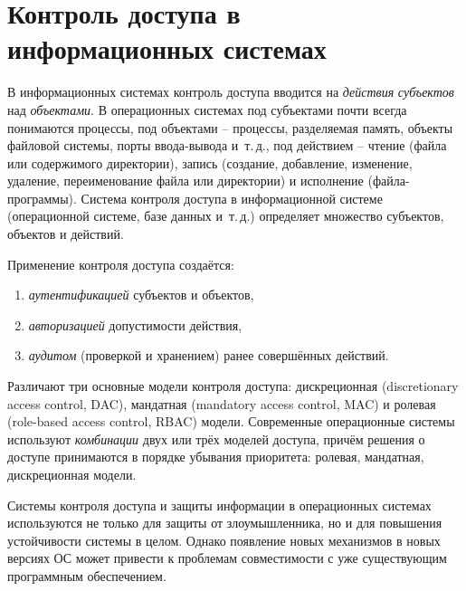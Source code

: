 \section[Контроль доступа в информационных системах]{Контроль доступа в \protect\\ информационных системах}


В информационных системах контроль доступа вводится на \emph{действия} \emph{субъектов} над \emph{объектами}. В операционных системах под субъектами почти всегда понимаются процессы, под объектами -- процессы, разделяемая память, объекты файловой системы, порты ввода-вывода и~т.\,д., под действием -- чтение (файла или содержимого директории), запись (создание, добавление, изменение, удаление, переименование файла или директории) и исполнение (файла-программы). Система контроля доступа в информационной системе (операционной системе, базе данных и~т.\,д.) определяет множество субъектов, объектов и действий.

Применение контроля доступа создаётся:

\begin{enumerate}
	\item \emph{аутентификацией} субъектов и объектов,
	\item \emph{авторизацией} допустимости действия,
	\item \emph{аудитом} (проверкой и хранением) ранее совершённых действий.
\end{enumerate}

Различают три основные модели контроля доступа: дискреционная (discretionary access control, DAC), мандатная (mandatory access control, MAC) и ролевая (role-based access control, RBAC) модели. Современные операционные системы используют \emph{комбинации} двух или трёх моделей доступа, причём решения о доступе принимаются в порядке убывания приоритета: ролевая, мандатная, дискреционная модели.

Системы контроля доступа и защиты информации в операционных системах используются не только для защиты от злоумышленника, но и для повышения устойчивости системы в целом. Однако появление новых механизмов в новых версиях ОС может привести к проблемам совместимости с уже существующим программным обеспечением.

